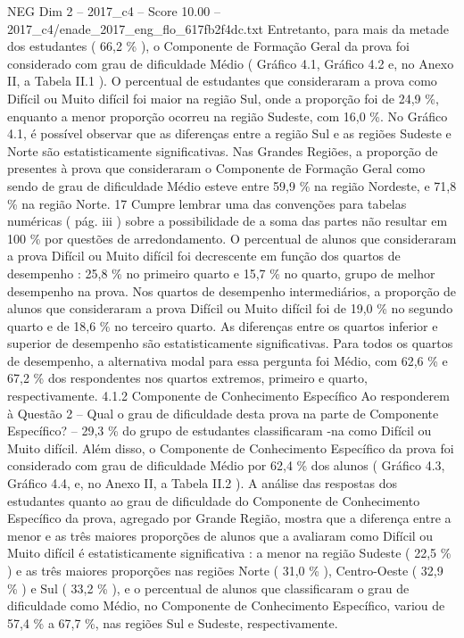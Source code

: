 \begin{textsample}{NEG Dim 2 – 2017\_c4 – Score 10.00 – 2017\_c4/enade\_2017\_eng\_flo\_617fb2f4dc.txt}
Entretanto, para mais da metade dos estudantes ( 66,2 \% ), o Componente de Formação Geral da prova foi considerado com grau de dificuldade Médio ( Gráfico 4.1, Gráfico 4.2 e, no Anexo II, a Tabela II.1 ).
O percentual de estudantes que consideraram a prova como Difícil ou Muito difícil foi maior na região Sul, onde a proporção foi de 24,9 \%, enquanto a menor proporção ocorreu na região Sudeste, com 16,0 \%.
No Gráfico 4.1, é possível observar que as diferenças entre a região Sul e as regiões Sudeste e Norte são estatisticamente significativas.
Nas Grandes Regiões, a proporção de presentes à prova que consideraram o Componente de Formação Geral como sendo de grau de dificuldade Médio esteve entre 59,9 \% na região Nordeste, e 71,8 \% na região Norte. 17 Cumpre lembrar uma das convenções para tabelas numéricas ( pág. iii ) sobre a possibilidade de a soma das partes não resultar em 100 \% por questões de arredondamento.
O percentual de alunos que consideraram a prova Difícil ou Muito difícil foi decrescente em função dos quartos de desempenho : 25,8 \% no primeiro quarto e 15,7 \% no quarto, grupo de melhor desempenho na prova.
Nos quartos de desempenho intermediários, a proporção de alunos que consideraram a prova Difícil ou Muito difícil foi de 19,0 \% no segundo quarto e de 18,6 \% no terceiro quarto.
As diferenças entre os quartos inferior e superior de desempenho são estatisticamente significativas.
Para todos os quartos de desempenho, a alternativa modal para essa pergunta foi Médio, com 62,6 \% e 67,2 \% dos respondentes nos quartos extremos, primeiro e quarto, respectivamente. 4.1.2 Componente de Conhecimento Específico Ao responderem à Questão 2 – Qual o grau de dificuldade desta prova na parte de Componente Específico? – 29,3 \% do grupo de estudantes classificaram -na como Difícil ou Muito difícil.
Além disso, o Componente de Conhecimento Específico da prova foi considerado com grau de dificuldade Médio por 62,4 \% dos alunos ( Gráfico 4.3, Gráfico 4.4, e, no Anexo II, a Tabela II.2 ).
A análise das respostas dos estudantes quanto ao grau de dificuldade do Componente de Conhecimento Específico da prova, agregado por Grande Região, mostra que a diferença entre a menor e as três maiores proporções de alunos que a avaliaram como Difícil ou Muito difícil é estatisticamente significativa : a menor na região Sudeste ( 22,5 \% ) e as três maiores proporções nas regiões Norte ( 31,0 \% ), Centro-Oeste ( 32,9 \% ) e Sul ( 33,2 \% ), e o percentual de alunos que classificaram o grau de dificuldade como Médio, no Componente de Conhecimento Específico, variou de 57,4 \% a 67,7 \%, nas regiões Sul e Sudeste, respectivamente.

\end{textsample}

